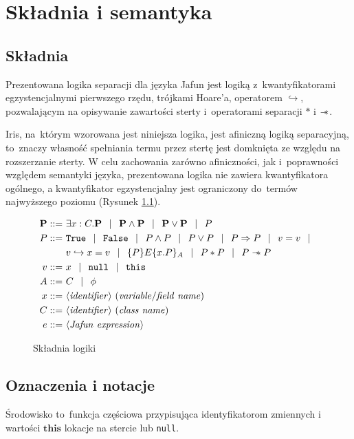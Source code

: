 \documentclass[]{pracamgr}
\newcommand \wand {\mathrel{-\mkern-6mu*}}
\newcommand \outerP {\mathbf{P}}
\newcommand \hoare [5] {\{#1\}#2\{#4.#5\}_#3}
\renewcommand \| {\hspace{0.75em} | \hspace{0.75em} }
\renewcommand \[ {[\![}
\renewcommand \] {]\!]}
\theoremstyle{definition}
\newcommand{\jthis}{\textbf{this}\xspace}
\begin{document}
\chapter{Składnia i semantyka}

\section{Składnia}
Prezentowana logika separacji dla języka Jafun jest logiką z~kwantyfikatorami egzystencjalnymi pierwszego rzędu, trójkami Hoare'a, operatorem $\hookrightarrow$,
pozwalającym na opisywanie zawartości sterty i~operatorami separacji $*$ i $\wand$.

Iris, na~którym wzorowana jest niniejsza logika, jest afiniczną logiką separacyjną, to~znaczy
własność spełniania termu przez stertę jest domknięta ze względu na rozszerzanie sterty.
W celu zachowania zarówno afiniczności, jak i~poprawności względem semantyki
języka, prezentowana logika nie zawiera kwantyfikatora ogólnego,
a kwantyfikator egzystencjalny jest ograniczony
do~termów najwyższego poziomu (Rysunek \ref{fig:syntax}).


\begin{figure}[h]
\begin{align*}
 \outerP ::= & \ \exists x : C.\outerP \| \outerP \wedge \outerP \| \outerP \vee \outerP \| P \\
 P ::= & \ \mathtt{True} \| \mathtt{False} \| P \wedge P \| P \vee P \| P \Rightarrow P \| v = v \| \\
     & \  v \hookrightarrow x = v \| \hoare{P}{E}{A}{x}{P} \|  P * P \| P \wand P \\
 v ::= & \  x \| \mathtt{null} \| \mathtt{this} \\
 A ::= & \ C \| \phi \\
 x ::= & \ \langle\mathit{identifier}\rangle \ (\mathit{variable / field\ name}) \\
 C ::= & \ \langle\mathit{identifier}\rangle \ (\mathit{class\ name}) \\
 e ::= & \ \langle \mathit{Jafun\ expression} \rangle
\end{align*}
\caption{Składnia logiki}
\label{fig:syntax}
\end{figure}

\section{Oznaczenia i notacje}

Środowisko to~funkcja częściowa przypisująca identyfikatorom zmiennych i wartości $\jthis$
lokacje na stercie lub \texttt{null}.
\end{document}
